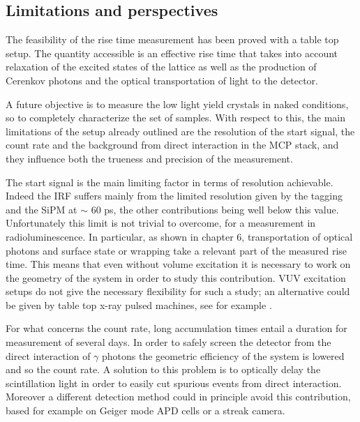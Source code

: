 \subsection{Limitations and perspectives}
The feasibility of the rise time measurement has been proved with a table top setup. The quantity accessible is an effective rise time that takes into account relaxation of the excited states of the lattice as well as the production of Cerenkov photons and the optical transportation of light to the detector.

A future objective is to measure the low light yield crystals in naked conditions, so to completely characterize the set of samples. With respect to this, the main limitations of the setup already outlined are the resolution of the start signal, the count rate and the background from direct interaction in the MCP stack, and they influence both the trueness and precision of the measurement.

The start signal is the main limiting factor in terms of resolution achievable. Indeed the IRF suffers mainly from the limited resolution given by the tagging and the SiPM at $\sim$ 60 ps, the other contributions being well below this value. Unfortunately this limit is not trivial to overcome, for a measurement in radioluminescence. 
In particular, as shown in chapter 6, transportation of optical photons and surface state or wrapping take a relevant part of the measured rise time. This means that even without volume excitation it is necessary to work on the geometry of the system in order to study this contribution.
VUV excitation setups do not give the necessary flexibility for such a study; an alternative could be given by table top x-ray pulsed machines, see for example \cite{Derenzo2000}.

For what concerns the count rate, long accumulation times entail a duration for measurement of several days. In order to safely screen the detector from the direct interaction of $\gamma$ photons the geometric efficiency of the system is lowered and so the count rate.
A solution to this problem is to optically delay the scintillation light in order to easily cut spurious events from direct interaction. Moreover a different detection method could in principle avoid this contribution, based for example on Geiger mode APD cells or a streak camera.